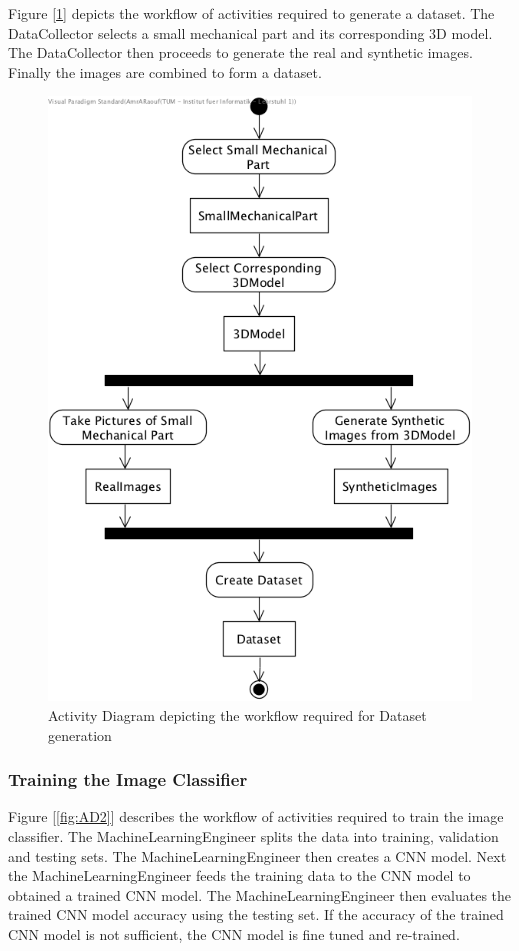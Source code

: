 \documentclass[a4paper,12pt,twoside]{report}
\begin{document}
Figure [\ref{fig:AD1}] depicts the workflow of activities required to generate a dataset. The DataCollector selects a small mechanical part and its corresponding 3D model. The DataCollector then proceeds to generate the real and synthetic images. Finally the images are combined to form a dataset.

\begin{figure}[h]
\centering
  \includegraphics[width=\textwidth]{AD1}
\caption{Activity Diagram depicting the workflow required for Dataset generation}
\label{fig:AD1}
\end{figure}

\subsubsection{Training the Image Classifier}

Figure [\ref{fig:AD2}] describes the workflow of activities required to train the image classifier. The MachineLearningEngineer splits the data into training, validation and testing sets. The MachineLearningEngineer then creates a CNN model. Next the MachineLearningEngineer feeds the training data to the CNN model to obtained a trained CNN model. The MachineLearningEngineer then evaluates the trained CNN model accuracy using the testing set. If the accuracy of the trained CNN model is not sufficient, the CNN model is fine tuned and re-trained.
\end{document}
